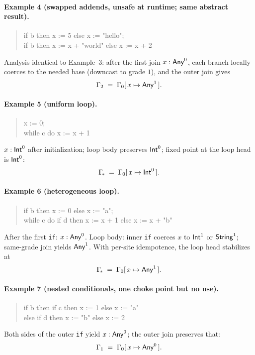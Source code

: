 \paragraph{Example 4 (swapped addends, unsafe at runtime; same abstract result).}
\begin{quote}\ttfamily
if b then x := 5 else x := "hello";\\
if b then x := x + "world" else x := x + 2
\end{quote}
Analysis identical to Example~3: after the first join $x:\mathsf{Any}^{0}$, each branch
locally coerces to the needed base (downcast to grade $1$), and the outer join gives
\[
\Gamma_2 \;=\; \Gamma_0[\,x \mapsto \mathsf{Any}^{1}\,].
\]

\paragraph{Example 5 (uniform loop).}
\begin{quote}\ttfamily
x := 0;\\
while c do x := x + 1
\end{quote}
$x:\mathsf{Int}^{0}$ after initialization; loop body preserves $\mathsf{Int}^{0}$;
fixed point at the loop head is $\mathsf{Int}^{0}$:
\[
\Gamma_{\!*} \;=\; \Gamma_0[\,x \mapsto \mathsf{Int}^{0}\,].
\]

\paragraph{Example 6 (heterogeneous loop).}
\begin{quote}\ttfamily
if b then x := 0 else x := "a";\\
while c do if d then x := x + 1 else x := x + "b"
\end{quote}
After the first \texttt{if}: $x:\mathsf{Any}^{0}$.  
Loop body: inner \texttt{if} coerces $x$ to $\mathsf{Int}^{1}$ or $\mathsf{String}^{1}$; same-grade join yields $\mathsf{Any}^{1}$.
With per-site idempotence, the loop head stabilizes at
\[
\Gamma_{\!*} \;=\; \Gamma_0[\,x \mapsto \mathsf{Any}^{1}\,].
\]

\paragraph{Example 7 (nested conditionals, one choke point but no use).}
\begin{quote}\ttfamily
if b then if c then x := 1 else x := "a"\\
\phantom{if b\ } else if d then x := "b" else x := 2
\end{quote}
Both sides of the outer \texttt{if} yield $x:\mathsf{Any}^{0}$; the outer join preserves that:
\[
\Gamma_1 \;=\; \Gamma_0[\,x \mapsto \mathsf{Any}^{0}\,].
\]

